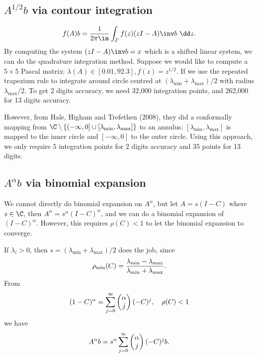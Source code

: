 \documentclass{article}
\begin{document}
\subsection{$A^{1/2}b$ via contour integration}
\begin{equation}\notag
    f(A) b = \frac{1}{2\pi \im} \int_{\varGamma}f(z)(zI - A)\inv b~\dd z.
\end{equation}
By computing the system $(zI - A)\inv b = x$ which is a shifted linear
system, we can do the quadrature integration method. Suppose we would like to compute a
$5\times 5$ Pascal matrix: $\lambda(A)\in [0.01,92.3], f(z) = z^{1/2}$. If
we use the repeated trapezium rule to integrate around circle centred at
$(\lambda_{\min}+\lambda_{\max})/2$ with radius $\lambda_{\max}/2$. To
get 2 digits accuracy, we need 32,000 integration points, and 262,000
for 13 digits accuracy.

However, from Hale, Higham and Trefethen (2008), they did a conformally
mapping from $\C\setminus\{(-\infty,0]\cup
[\lambda_{\min},\lambda_{\max} ]\}$ to an annulus:
$[\lambda_{\min},\lambda_{\max}]$ is mapped to the inner circle and
$[-\infty,0]$ to the outer circle. Using this approach, we only require
$5$ integration points for 2 digits accuracy and 35 points for 13
digits. 

\subsection{$A^{\alpha}b$ via binomial expansion}
We cannot directly do binomial expansion on $A^{\alpha}$, but let $A =
s(I-C)$ where $s\in\C$, then $A^{\alpha} = s^{\alpha}(I - C)^{\alpha}$,
and we can do a binomial expansion of $(I-C)^{\alpha}$. However, this
requires $\rho(C) <1$ to let the binomial expansion to converge.

If $\lambda_i > 0$, then $s = (\lambda_{\min}+\lambda_{\max})/2$ does
the job, since 
\begin{equation}\notag
    \rho_{\min}(C) = \frac{\lambda_{\min}-\lambda_{\max}}{\lambda_{\min}+\lambda_{\max}}.
\end{equation}
From 
\begin{equation}\notag
    (1-C)^{\alpha} = \sum_{j=0}^\infty \begin{pmatrix}
        \alpha \\ j
    \end{pmatrix}(-C)^j,\quad \rho(C) < 1
\end{equation}
we have 
\begin{equation}\notag
    A^{\alpha}b = s^{\alpha}\sum_{j=0}^\infty \begin{pmatrix}
        \alpha \\ j
    \end{pmatrix}(-C)^j b.
\end{equation}
\end{document}

